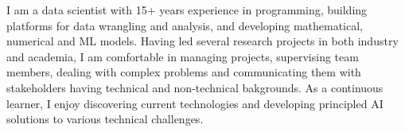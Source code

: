 \documentclass[
	a4paper,
]{fortysecondscv}
\begin{document}
\makefrontsidebar

I am a data scientist with %
15+ years experience in programming, building platforms for data wrangling and analysis, and developing mathematical, numerical and ML models.
Having led several research projects in both industry and academia, I am comfortable in managing projects, supervising team members, dealing with complex problems and communicating them with stakeholders having technical and non-technical bakgrounds.
As a continuous learner, I enjoy discovering current technologies and developing principled AI solutions to various technical challenges.

 
\end{document}
